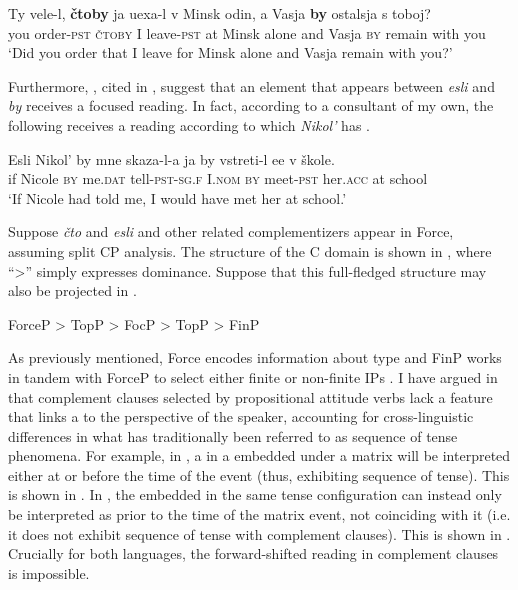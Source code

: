 \documentclass[output=paper,modfonts,newtxmath,hidelinks,]{langscibook}
\begin{document}
\ea \label{10:ex28}
	 \gll Ty vele-l, \textbf{čtoby} ja uexa-l v Minsk odin, a Vasja \textbf{by} ostalsja s toboj?\\
     you order\textsc{-pst} \textsc{čtoby} I leave\textsc{-pst} at Minsk alone and Vasja \textsc{by} remain with you\\
\glt `Did you order that I leave for Minsk alone and Vasja remain with you?'\\
\hfill \citep[36]{Brecht1977}
\z

\noindent Furthermore, \citet{BarnetovaEtAl1979}, cited in \citet{Hacking1998}, suggest that an element that appears between \textit{esli} and \textit{by} receives a focused reading. In fact, according to a consultant of my own, the following receives a reading according to which \textit{Nikol’} has .

\ea \label{10:ex29}
\gll Esli Nikol’ by mne skaza-l-a ja by vstreti-l ee v škole.\\
     if Nicole \textsc{by} me.\textsc{dat} tell\textsc{-pst-sg.f} I.\textsc{nom} \textsc{by} meet\textsc{-pst} her.\textsc{acc} at school\\
\glt `If Nicole had told me, I would have met her at school.'
\z

\noindent Suppose \textit{čto} and \textit{esli} and other related complementizers appear in Force, assuming  split CP analysis. The structure of the C domain is shown in , where “>” simply expresses dominance. Suppose that this full-fledged structure may also be projected in .

\ea \label{10:ex30}
	ForceP > TopP > FocP > TopP > FinP \hfill \citep[297]{rizzi1997}
\z

\noindent As previously mentioned, Force encodes information about  type and FinP works in tandem with ForceP to select either finite or non-finite IPs \citep{rizzi1997}. I have argued in \citet{Melara2014} that complement clauses selected by propositional attitude verbs lack a feature that links a  to the perspective of the speaker, accounting for cross-linguistic differences in what has traditionally been referred to as sequence of tense phenomena. For example, in , a  in a  embedded under a matrix  will be interpreted either at or before the time of the  event (thus, exhibiting sequence of tense). This is shown in . In , the embedded  in the same tense configuration can instead only be interpreted as prior to the time of the matrix event, not coinciding with it (i.e. it does not exhibit sequence of tense with complement clauses). This is shown in . Crucially for both languages, the forward-shifted reading in complement clauses is impossible.
\end{document}
